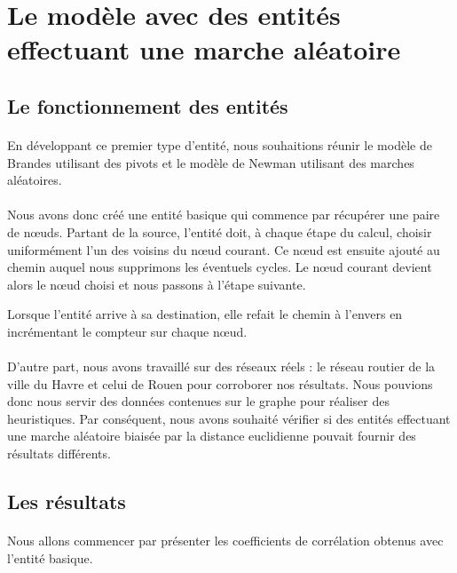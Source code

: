 \documentclass[a4paper, 10pt]{report}
\begin{document}
	\section{Le modèle avec des entités effectuant une marche aléatoire}
	
		\subsection{Le fonctionnement des entités}

\paragraph{}En développant ce premier type d'entité, nous souhaitions réunir le modèle de Brandes utilisant des pivots et le modèle de Newman utilisant des marches aléatoires.

\paragraph{}Nous avons donc créé une entité basique qui commence par récupérer une paire de n\oe uds. Partant de la source, l'entité doit, à chaque étape du calcul, choisir uniformément l'un des voisins du n\oe ud courant. Ce n\oe ud est ensuite ajouté au chemin auquel nous supprimons les éventuels cycles. Le n\oe ud courant devient alors le n\oe ud choisi et nous passons à l'étape suivante.

Lorsque l'entité arrive à sa destination, elle refait le chemin à l'envers en incrémentant le compteur sur chaque n\oe ud.

\paragraph{}D'autre part, nous avons travaillé sur des réseaux réels : le réseau routier de la ville du Havre et celui de Rouen pour corroborer nos résultats. Nous pouvions donc nous servir des données contenues sur le graphe pour réaliser des heuristiques. Par conséquent, nous avons souhaité vérifier si des entités effectuant une marche aléatoire biaisée par la distance euclidienne pouvait fournir des résultats différents.

	\subsection{Les résultats}

%
%
\paragraph{}Nous allons commencer par présenter les coefficients de corrélation obtenus avec l'entité basique.
\end{document}
